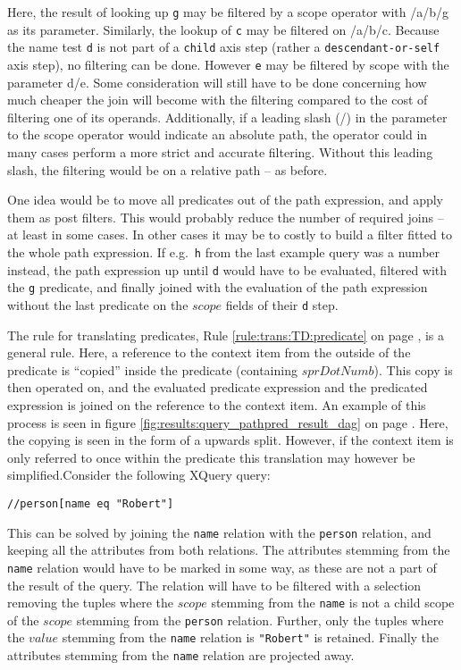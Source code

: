 Here, the result of looking up \texttt{g} may be filtered by a \textsf{scope} operator with \textsf{/a/b/g} as its
parameter. Similarly, the lookup of \texttt{c} may be filtered on \textsf{/a/b/c}. Because the name test \texttt{d}
is not part of a \texttt{child} axis step (rather a \texttt{descendant-or-self} axis step), no filtering can be
done. However \texttt{e} may be filtered by \textsf{scope} with the parameter
\textsf{d/e}. Some consideration will still have to be done concerning how much cheaper the join will become with the filtering compared to the cost
of filtering one of its operands. Additionally, if a leading slash (\textsf{/}) in the parameter to the
\textsf{scope} operator would indicate an absolute path, the operator could in many cases perform a more strict
and accurate filtering. Without this leading slash, the filtering would be on a relative path -- as before.

One idea would be to move all predicates out of the path expression, and apply them as post filters. This would
probably reduce the number of required joins -- at least in some cases. In other cases it may be to costly to build
a filter fitted to the whole path expression. If e.g.\ \texttt{h} from the last example query was a number instead,
the path expression up until \texttt{d} would have to be evaluated, filtered with the \texttt{g} predicate, and
finally joined with the evaluation of the path expression without the last predicate on the $scope$ fields of their
\texttt{d} step.

The rule for translating predicates, Rule \ref{rule:trans:TD:predicate} on page \pageref{rule:trans:TD:predicate},
is a general rule. Here, a reference to the context item from the outside of the predicate is ``copied'' inside the
predicate (containing $sprDotNumb$). This copy is then operated on, and the evaluated predicate expression and the
predicated expression is joined on the reference to the context item. An example of this process is seen in figure
\ref{fig:results:query_pathpred_result_dag} on page \pageref{fig:results:query_pathpred_result_dag}. Here, the
copying is seen in the form of a upwards split. However, if the context item is only referred to once within
the predicate this translation may however be simplified.Consider the following XQuery query:

\begin{center}
\texttt{//person[name eq "Robert"]}
\end{center}

This can be solved by joining the \texttt{name} relation with the \texttt{person} relation, and keeping all the
attributes from both relations. The attributes stemming from the \texttt{name} relation would have to be marked in
some way, as these are not a part of the result of the query. The relation will have to be filtered with a
selection removing the tuples where the $scope$ stemming from the \texttt{name} is not a child scope of the
$scope$ stemming from the \texttt{person} relation. Further, only the tuples where the $value$ stemming from the
\texttt{name} relation is \texttt{"Robert"} is retained. Finally the attributes stemming from the \texttt{name}
relation are projected away.

